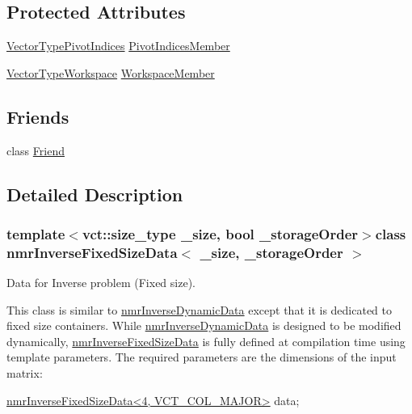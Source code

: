 \subsection*{Protected Attributes}
\begin{DoxyCompactItemize}
\item 
\hyperlink{classnmr_inverse_fixed_size_data_ac8e0c496927d3fe726116c4c6ddf5af2}{Vector\+Type\+Pivot\+Indices} \hyperlink{classnmr_inverse_fixed_size_data_aab37fa3e8096dc8ec9ac1b9098c34769}{Pivot\+Indices\+Member}
\item 
\hyperlink{classnmr_inverse_fixed_size_data_ac3e08c421f20d9f34917b2cdc03f3b34}{Vector\+Type\+Workspace} \hyperlink{classnmr_inverse_fixed_size_data_a701268b213e63dd44ad0a9869fc20e15}{Workspace\+Member}
\end{DoxyCompactItemize}
\subsection*{Friends}
\begin{DoxyCompactItemize}
\item 
class \hyperlink{classnmr_inverse_fixed_size_data_a7f8321d57e81bc613d5dbef3410ba70e}{Friend}
\end{DoxyCompactItemize}


\subsection{Detailed Description}
\subsubsection*{template$<$vct\+::size\+\_\+type \+\_\+size, bool \+\_\+storage\+Order$>$class nmr\+Inverse\+Fixed\+Size\+Data$<$ \+\_\+size, \+\_\+storage\+Order $>$}

Data for Inverse problem (Fixed size). 

This class is similar to \hyperlink{classnmr_inverse_dynamic_data}{nmr\+Inverse\+Dynamic\+Data} except that it is dedicated to fixed size containers. While \hyperlink{classnmr_inverse_dynamic_data}{nmr\+Inverse\+Dynamic\+Data} is designed to be modified dynamically, \hyperlink{classnmr_inverse_fixed_size_data}{nmr\+Inverse\+Fixed\+Size\+Data} is fully defined at compilation time using template parameters. The required parameters are the dimensions of the input matrix\+: 
\begin{DoxyCode}
\hyperlink{classnmr_inverse_fixed_size_data}{nmrInverseFixedSizeData<4, VCT\_COL\_MAJOR>} data;
\end{DoxyCode}


